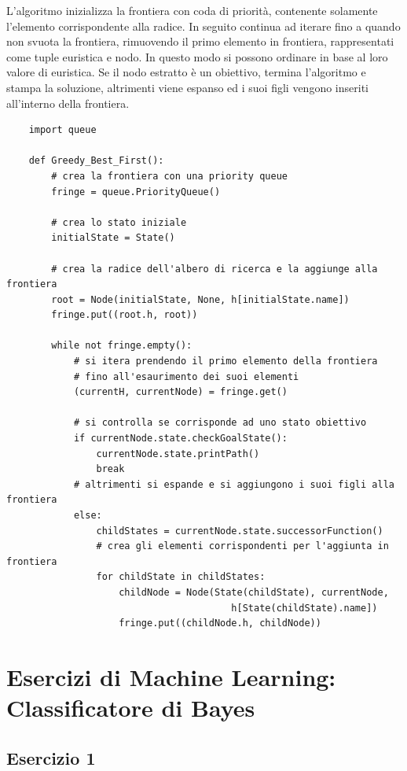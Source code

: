 \documentclass{article}
\numberwithin{equation}{section}
\begin{document}
L'algoritmo inizializza la frontiera con coda di priorità, contenente solamente l'elemento 
corrispondente alla radice. In seguito continua ad iterare fino a quando non svuota la 
frontiera, rimuovendo il primo elemento in frontiera, rappresentati come tuple euristica e 
nodo. In questo modo si possono ordinare in base al loro valore di euristica. Se il nodo 
estratto è un obiettivo, termina l'algoritmo e stampa la soluzione, altrimenti viene espanso ed i suoi 
figli vengono inseriti all'interno della frontiera. 
\begin{verbatim}
    import queue 

    def Greedy_Best_First():
        # crea la frontiera con una priority queue
        fringe = queue.PriorityQueue() 

        # crea lo stato iniziale
        initialState = State()

        # crea la radice dell'albero di ricerca e la aggiunge alla frontiera
        root = Node(initialState, None, h[initialState.name])
        fringe.put((root.h, root))

        while not fringe.empty():
            # si itera prendendo il primo elemento della frontiera
            # fino all'esaurimento dei suoi elementi
            (currentH, currentNode) = fringe.get()

            # si controlla se corrisponde ad uno stato obiettivo
            if currentNode.state.checkGoalState():
                currentNode.state.printPath()
                break
            # altrimenti si espande e si aggiungono i suoi figli alla frontiera
            else: 
                childStates = currentNode.state.successorFunction()
                # crea gli elementi corrispondenti per l'aggiunta in frontiera
                for childState in childStates:
                    childNode = Node(State(childState), currentNode, 
                                        h[State(childState).name])
                    fringe.put((childNode.h, childNode))
\end{verbatim}

\clearpage

\section{Esercizi di Machine Learning: Classificatore di Bayes}

\subsection{Esercizio 1}
\end{document}
